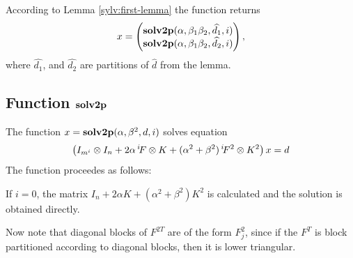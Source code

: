 \documentclass[11pt,a4paper]{article}
\begin{document}
According to Lemma \ref{sylv:first-lemma} the function returns
$$
x=\begin{pmatrix}\mathbf{solv2p}(\alpha,\beta_1\beta_2,\widehat{d_1},i)\cr
          \mathbf{solv2p}(\alpha,\beta_1\beta_2,\widehat{d_2},i)\end{pmatrix},
$$
where $\widehat{d_1}$, and $\widehat{d_2}$ are partitions of
$\widehat{d}$ from the lemma.

\subsection{Function $\mathbf{solv2p}$}

The function $x=\mathbf{solv2p}(\alpha,\beta^2,d,i)$ solves equation
$$
\left(I_{m^i}\otimes I_n + 2\alpha\,^i\!F\otimes K +
(\alpha^2+\beta^2)\,^i\!F^2\otimes K^2\right)x = d
$$
The function proceedes as follows:

If $i=0$, the matrix $I_n+2\alpha K+(\alpha^2+\beta^2)K^2$ is
calculated and the solution is obtained directly.

Now note that diagonal blocks of $F^{2T}$ are of the form $F_j^2$,
since if the $F^T$ is block partitioned according to diagonal blocks,
then it is lower triangular.
\end{document}
